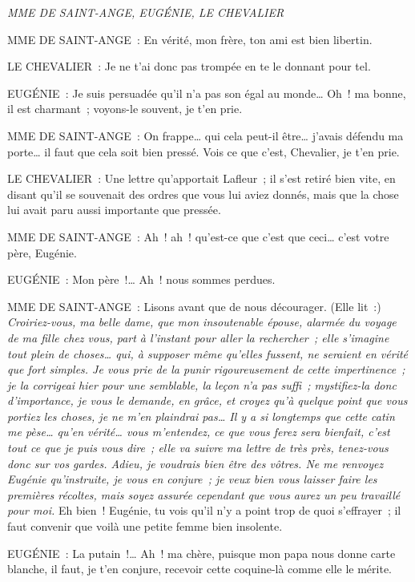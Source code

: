 \documentclass[french,twoside]{book} %
\begin{document}
\textit{MME DE SAINT-ANGE, EUGÉNIE, LE CHEVALIER}\par
\noindent MME DE SAINT-ANGE : En vérité, mon frère, ton ami est bien libertin.\par
LE CHEVALIER : Je ne t’ai donc pas trompée en te le donnant pour tel.\par
EUGÉNIE : Je suis persuadée qu’il n’a pas son égal au monde… Oh ! ma bonne, il est charmant ; voyons-le souvent, je t’en prie.\par
MME DE SAINT-ANGE : On frappe… qui cela peut-il être… j’avais défendu ma porte… il faut que cela soit bien pressé. Vois ce que c’est, Chevalier, je t’en prie.\par
LE CHEVALIER : Une lettre qu’apportait Lafleur ; il s’est retiré bien vite, en disant qu’il se souvenait des ordres que vous lui aviez donnés, mais que la chose lui avait paru aussi importante que pressée.\par
MME DE SAINT-ANGE : Ah ! ah ! qu’est-ce que c’est que ceci… c’est votre père, Eugénie.\par
EUGÉNIE : Mon père !… Ah ! nous sommes perdues.\par
MME DE SAINT-ANGE : Lisons avant que de nous décourager. (Elle lit :) {\itshape Croiriez-vous, ma belle dame, que mon insoutenable épouse, alarmée du voyage de ma fille chez vous, part à l’instant pour aller la rechercher ; elle s’imagine tout plein de choses… qui, à supposer même qu’elles fussent, ne seraient en vérité que fort simples. Je vous prie de la punir rigoureusement de cette impertinence ; je la corrigeai hier pour une semblable, la leçon n’a pas suffi ; mystifiez-la donc d’importance, je vous le demande, en grâce, et croyez qu’à quelque point que vous portiez les choses, je ne m’en plaindrai pas… Il y a si longtemps que cette catin me pèse… qu’en vérité… vous m’entendez, ce que vous ferez sera bienfait, c’est tout ce que je puis vous dire ; elle va suivre ma lettre de très près, tenez-vous donc sur vos gardes. Adieu, je voudrais bien être des vôtres. Ne me renvoyez Eugénie qu’instruite, je vous en conjure ; je veux bien vous laisser faire les premières récoltes, mais soyez assurée cependant que vous aurez un peu travaillé pour moi.} Eh bien ! Eugénie, tu vois qu’il n’y a point trop de quoi s’effrayer ; il faut convenir que voilà une petite femme bien insolente.\par
EUGÉNIE : La putain !… Ah ! ma chère, puisque mon papa nous donne carte blanche, il faut, je t’en conjure, recevoir cette coquine-là comme elle le mérite.\par
\end{document}
